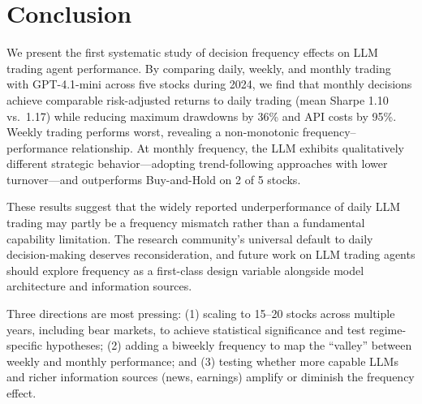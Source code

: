 \section{Conclusion}
\label{sec:conclusion}

We present the first systematic study of decision frequency effects on LLM trading agent performance. By comparing daily, weekly, and monthly trading with GPT-4.1-mini across five stocks during 2024, we find that monthly decisions achieve comparable risk-adjusted returns to daily trading (mean Sharpe 1.10 vs.\ 1.17) while reducing maximum drawdowns by 36\% and API costs by 95\%. Weekly trading performs worst, revealing a non-monotonic frequency--performance relationship. At monthly frequency, the LLM exhibits qualitatively different strategic behavior---adopting trend-following approaches with lower turnover---and outperforms Buy-and-Hold on 2 of 5 stocks.

These results suggest that the widely reported underperformance of daily LLM trading may partly be a frequency mismatch rather than a fundamental capability limitation. The research community's universal default to daily decision-making deserves reconsideration, and future work on LLM trading agents should explore frequency as a first-class design variable alongside model architecture and information sources.

Three directions are most pressing: (1) scaling to 15--20 stocks across multiple years, including bear markets, to achieve statistical significance and test regime-specific hypotheses; (2) adding a biweekly frequency to map the ``valley'' between weekly and monthly performance; and (3) testing whether more capable LLMs and richer information sources (\eg news, earnings) amplify or diminish the frequency effect.
